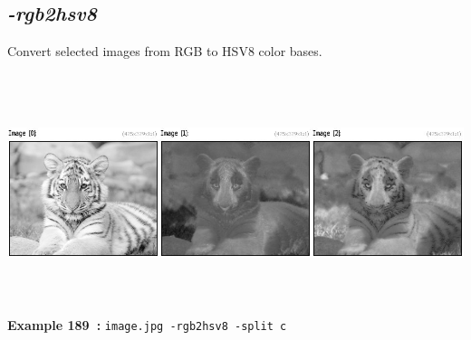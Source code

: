 \documentclass[a4paper,11pt,twoside]{book}
\begin{document}
\subsection{\emph{-rgb2hsv8} }\vspace*{-0.5em}
Convert selected images from RGB to HSV8 color bases.
\begin{center}\includegraphics[keepaspectratio=true,height=7cm,width=\textwidth]{img/gmic_def189.jpg}\\
{\footnotesize \textbf{Example 189~:} \texttt{image.jpg -rgb2hsv8 -split c}}
\end{center}
\end{document}
